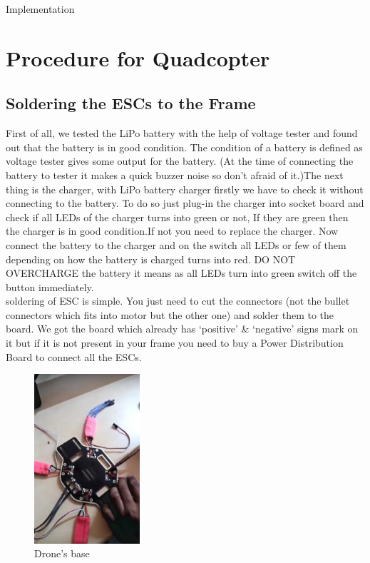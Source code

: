 \documentclass[12pt, oneside]{report}
\numberwithin{equation}{section}
\begin{document}
\begin{chapter}{Implementation}
\section{Procedure for Quadcopter}
\subsection{Soldering the ESCs to the Frame}
First of all, we tested the LiPo battery with the help of voltage tester and found
out that the battery is in good condition. The condition of a battery is defined
as voltage tester gives some output for the battery. (At the time of connecting the battery to tester it makes a quick buzzer noise so don’t afraid of it.)The next
thing is the charger, with LiPo battery charger firstly we have to check it without
connecting to the battery. To do so just plug-in the charger into socket board and
check if all LEDs of the charger turns into green or not, If they are green then
the charger is in good condition.If not you need to replace the charger. Now
connect the battery to the charger and on the switch all LEDs or few of them
depending on how the battery is charged turns into red. DO NOT OVERCHARGE the
battery it means as all LEDs turn into green switch off the button immediately.
\\
soldering of ESC is simple. You just need to cut the connectors (not the bullet
connectors which fits into motor but the other one) and solder them to the
board. We got the board which already has ‘positive’ \& ‘negative’ signs mark on
it but if it is not present in your frame you need to buy a Power Distribution
Board to connect all the ESCs.
\begin{figure}
\center
\includegraphics[width=0.35\textwidth]{base}
\caption{Drone's base}
\end{figure}


\end{chapter}
\end{document}
